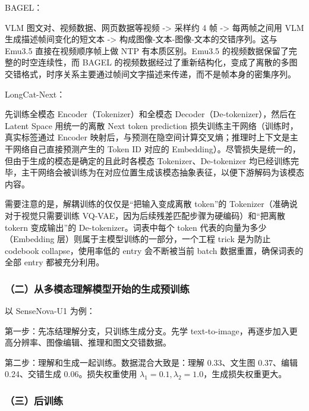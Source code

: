 BAGEL：

VLM 图文对、视频数据、网页数据等视频 -\textgreater{} 采样约 4 帧 -\textgreater{} 每两帧之间用 VLM 生成描述帧间变化的短文本 -\textgreater{} 构成图像-文本-图像-文本的交错序列。这与 Emu3.5 直接在视频顺序帧上做 NTP 有本质区别。Emu3.5 的视频数据保留了完整的时空连续性，而 BAGEL 的视频数据经过了重新结构化，变成了离散的多图交错格式，时序关系主要通过帧间文字描述来传递，而不是帧本身的密集序列。

LongCat-Next：

先训练全模态 Encoder（Tokenizer）和全模态 Decoder（De-tokenizer），然后在 Latent Space 用统一的离散 Next token prediction 损失训练主干网络（训练时，真实标签通过 Encoder 映射后，与预测在隐空间计算交叉熵；推理时上下文是主干网络自己直接预测产生的 Token ID 对应的 Embedding）。尽管损失是统一的，但由于生成的模态是确定的且此时各模态 Tokenizer、De-tokenizer 均已经训练完毕，主干网络会被训练为在对应位置生成该模态抽象表征，以便下游解码为该模态内容。

需要注意的是，解耦训练的仅仅是``把输入变成离散 token''的 Tokenizer（准确说对于视觉只需要训练 VQ-VAE，因为后续残差匹配步骤为硬编码）和``把离散 tokern 变成输出''的 De-tokenizer。词表中每个 token 代表的向量为多少（Embedding 层）则属于主模型训练的一部分，一个工程 trick 是为防止 codebook collapse，使用率低的 entry 会不断被当前 batch 数据重置，确保词表的全部 entry 都被充分利用。

\hypertarget{ux4e8cux4eceux591aux6a21ux6001ux7406ux89e3ux6a21ux578bux5f00ux59cbux7684ux751fux6210ux9884ux8badux7ec3}{%
\subsubsection{（二）从多模态理解模型开始的生成预训练}\label{ux4e8cux4eceux591aux6a21ux6001ux7406ux89e3ux6a21ux578bux5f00ux59cbux7684ux751fux6210ux9884ux8badux7ec3}}

以 SenseNova-U1 为例：

第一步：先冻结理解分支，只训练生成分支。先学 text-to-image，再逐步加入更高分辨率、图像编辑、推理和图文交错数据。

第二步：理解和生成一起训练。数据混合大致是：理解 0.33、文生图 0.37、编辑 0.24、交错生成 0.06。损失权重使用 \(\lambda_1=0.1,\lambda_2=1.0\)，生成损失权重更大。

\hypertarget{ux4e09ux540eux8badux7ec3}{%
\subsubsection{（三）后训练}\label{ux4e09ux540eux8badux7ec3}}

